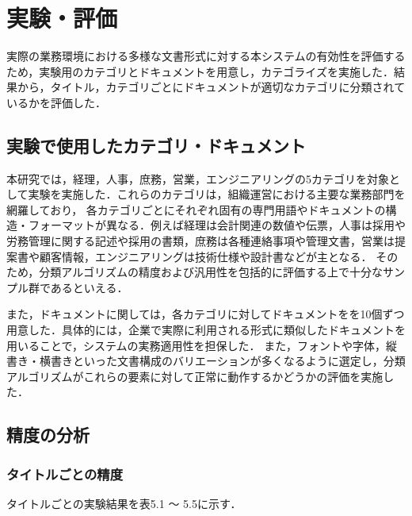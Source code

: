 \chapter{実験・評価}
\label{ch:exp}
\quad

実際の業務環境における多様な文書形式に対する本システムの有効性を評価するため，実験用のカテゴリとドキュメントを用意し，カテゴライズを実施した．結果から，タイトル，カテゴリごとにドキュメントが適切なカテゴリに分類されているかを評価した．

\section{実験で使用したカテゴリ・ドキュメント}
\label{subsec:resource}

本研究では，経理，人事，庶務，営業，エンジニアリングの5カテゴリを対象として実験を実施した．これらのカテゴリは，組織運営における主要な業務部門を網羅しており，
各カテゴリごとにそれぞれ固有の専門用語やドキュメントの構造・フォーマットが異なる．例えば経理は会計関連の数値や伝票，人事は採用や労務管理に関する記述や採用の書類，庶務は各種連絡事項や管理文書，営業は提案書や顧客情報，エンジニアリングは技術仕様や設計書などが主となる．
そのため，分類アルゴリズムの精度および汎用性を包括的に評価する上で十分なサンプル群であるといえる．

また，ドキュメントに関しては，各カテゴリに対してドキュメントをを10個ずつ用意した．具体的には，企業で実際に利用される形式に類似したドキュメントを用いることで，システムの実務適用性を担保した．
また，フォントや字体，縦書き・横書きといった文書構成のバリエーションが多くなるように選定し，分類アルゴリズムがこれらの要素に対して正常に動作するかどうかの評価を実施した．

\clearpage

\section{精度の分析}
\label{sec:exp_anal}

\subsection{タイトルごとの精度}
\label{subsec:title}

タイトルごとの実験結果を表5.1 ～ 5.5に示す．

